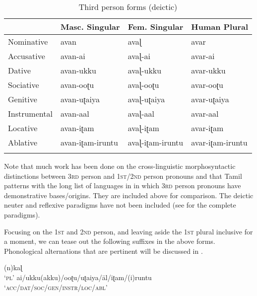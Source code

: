 \documentclass[output=paper]{langscibook}
\begin{document}
\begin{table}
    \begin{tabular}{llll}
    \lsptoprule
                 & Masc. Singular        & Fem. Singular              & Human Plural \\\midrule
    Nominative   & avan                  & avaɭ                    &  avar \\
    Accusative   & avan-ai          & avaɭ-ai            &  avar-ai \\
    Dative       & avan-ukku         & avaɭ-ukku         &  avar-ukku \\
    Sociative    & avan-ooʈu        & avaɭ-ooʈu          &  avar-ooʈu\\
    Genitive     & avan-uʈaiya      & avaɭ-uʈaiya        &  avar-uʈaiya             \\
    Instrumental & avan-aal         & avaɭ-aal           &  avar-aal         \\
    Locative     & avan-iʈam        & avaɭ-iʈam          &  avar-iʈam    \\
    Ablative     & avan-iʈam-iruntu & avaɭ-iʈam-iruntu   &  avar-iʈam-iruntu       \\\lspbottomrule
    \end{tabular}
    \caption{Third person forms (deictic) \citep{steever2019dravidian}\label{new2c}}
\end{table}

Note that much work has been done on the cross-linguistic morphosyntactic distinctions between 3\textsc{rd} person and 1\textsc{st}/2\textsc{nd} person pronouns and that Tamil patterns with the long list of languages in \citet{harley2002person} in which 3\textsc{rd} person pronouns have demonstrative bases/origins. They are included above for comparison. The deictic neuter and reflexive paradigms have not been included (see \citealt[110]{steever2019dravidian} for the complete paradigms). 

Focusing on the 1\textsc{st} and 2\textsc{nd} person, and leaving aside the 1\textsc{st} plural inclusive for a moment, we can tease out the following suffixes in the above forms. Phonological alternations that are pertinent will be discussed in .

\begin{exe}
\ex \label{new3}
\begin{xlist}
\ex \label{new3a}
(n)kaɭ\\‘\textsc{pl}’
\ex \label{new3b} ai/ukku(akku)/ooʈu/uʈaiya/āl/iʈam/(i)runtu  \\
  \textsc{‘acc/dat/soc/gen/instr/loc/abl’}
\end{xlist}
\end{exe}
\end{document}
